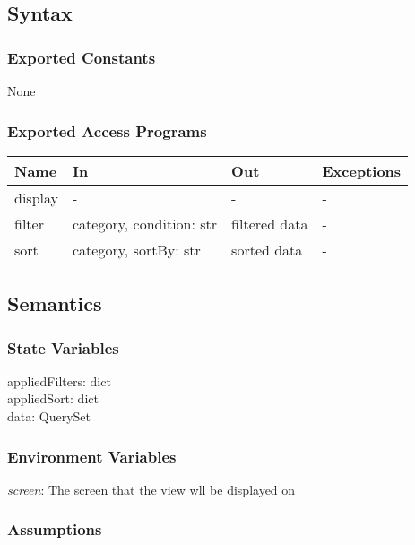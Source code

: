 \documentclass[12pt, titlepage]{article}
\begin{document}
\subsection{Syntax}

\subsubsection{Exported Constants}

None

\subsubsection{Exported Access Programs}

\begin{center}
\begin{tabular}{p{2cm} p{4cm} p{4cm} p{2cm}}
\hline
\textbf{Name} & \textbf{In} & \textbf{Out} & \textbf{Exceptions} \\
\hline
display & - & - & - \\
filter & category, condition: str & filtered data & - \\
sort & category, sortBy: str & sorted data & - \\
\hline
\end{tabular}
\end{center}

\subsection{Semantics}

\subsubsection{State Variables}

appliedFilters: dict \\
appliedSort: dict \\
data: QuerySet

\subsubsection{Environment Variables}

\textit{screen}: The screen that the view wll be displayed on

\subsubsection{Assumptions}
\end{document}
